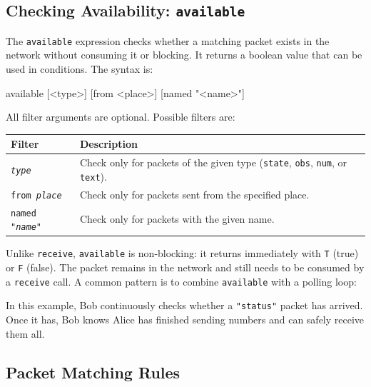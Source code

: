 \subsection{Checking Availability: \texttt{available}}
\label{sec:available}

The \texttt{available} expression checks whether a matching packet exists in
the network without consuming it or blocking. It returns a boolean value that
can be used in conditions. The syntax is:

\begin{codebox}
available [<type>] [from <place>] [named "<name>"]
\end{codebox}

All filter arguments are optional. Possible filters are:

\begin{center}
\begin{tabular}{|l|p{9cm}|}
\hline
\textbf{Filter} & \textbf{Description} \\
\hline
\texttt{\textit{type}} &
    Check only for packets of the given type (\texttt{state}, \texttt{obs},
    \texttt{num}, or \texttt{text}). \\
\hline
\texttt{from \textit{place}} &
    Check only for packets sent from the specified place. \\
\hline
\texttt{named "\textit{name}"} &
    Check only for packets with the given name. \\
\hline
\end{tabular}
\end{center}

Unlike \texttt{receive}, \texttt{available} is non-blocking: it
returns immediately with \texttt{T} (true) or \texttt{F} (false). The packet
remains in the network and still needs to be consumed by a \texttt{receive}
call. A common pattern is to combine \texttt{available} with a polling loop:



In this example, Bob continuously checks whether a \texttt{"status"} packet
has arrived. Once it has, Bob knows Alice has finished sending numbers and
can safely receive them all.

\subsection{Packet Matching Rules}
\label{sec:packet-matching}

